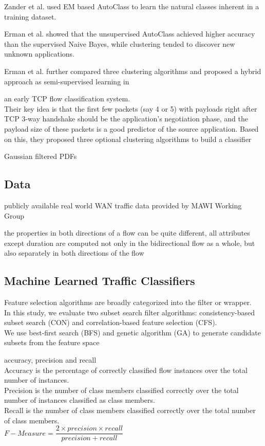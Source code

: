 \documentclass{article}
\begin{document}
Zander et al. used EM based AutoClass to learn the natural classes inherent in a training dataset.

Erman et al. showed that the unsupervised AutoClass achieved higher accuracy than the supervised Na\:ive Bayes, while clustering tended to discover new unknown applications.

Erman et al. further compared three clustering algorithms and proposed a hybrid approach as semi-supervised learning in

an early TCP flow classification system.\\
Their key idea is that the first few packets (say 4 or 5) with payloads right after TCP 3-way handshake should be the application's negotiation phase, and the payload size of these packets is a good predictor of the source application.  Based on this, they proposed three optional clustering algorithms to build a classifier

Gaussian filtered PDFs

\subsection{Data}\label{data}
publicly available real world WAN traffic data provided by MAWI Working Group

the properties in both directions of a flow can be quite different, all attributes except duration are computed not only in the bidirectional flow as a whole, 
but also separately in both directions of the flow

\subsection{Machine Learned Traffic Classifiers}\label{machine-learned-traffic-classifiers}

Feature selection algorithms are broadly categorized into the filter or wrapper.\\
In this study, we evaluate two subset search filter algorithms: consistency-based subset search (CON) and correlation-based feature selection (CFS).\\
We use best-first search (BFS) and genetic algorithm (GA) to generate candidate subsets from the feature space

accuracy, precision and recall\\
Accuracy is the percentage of correctly classified flow instances over the total number of instances.\\
Precision is the number of class members classified correctly over the total number of instances classified as class members.\\
Recall is the number of class members classified correctly over the total number of class members.\\
$F-Measure = \dfrac{2 \times precision \times recall}{precision + recall}$
\end{document}
